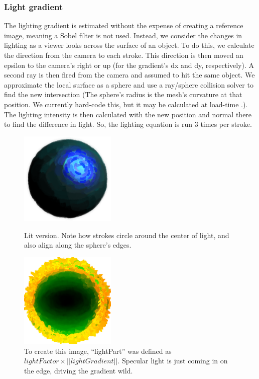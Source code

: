 \documentclass[conference]{acmsiggraph}
\begin{document}
\subsubsection{Light gradient}

The lighting gradient is estimated without the expense of creating a reference
image, meaning a Sobel filter is not used. Instead, we consider the changes in
lighting as a viewer looks across the surface of an object. To do this, we
calculate the direction from the camera to each stroke. This direction is then
moved an epsilon to the camera's right or up (for the gradient's dx and dy,
respectively). A second ray is then fired from the camera and assumed to hit
the same object. We approximate the local surface as a sphere and use a
ray/sphere collision solver to find the new intersection (The sphere's radius
is the mesh's curvature at that position. We currently hard-code this, but it
may be calculated at load-time \cite{gatzke2006estimating}.). The lighting
intensity is then calculated with the new position and normal there to find
the difference in light. So, the lighting equation is run 3 times per stroke.

\begin{figure}
  \centering
  \includegraphics[width=1.8in]{images/betterLightPartCamPart}
  \caption{Lit version. Note how strokes circle around the center of light, and
           also align along the sphere’s edges.}
  \includegraphics[width=1.8in]{images/betterLightPartWild}
  \caption{To create this image, ``lightPart'' was defined as
           $lightFactor \times ||lightGradient||$. Specular light is just
           coming in on the edge, driving the gradient wild.}
\end{figure}
\end{document}
